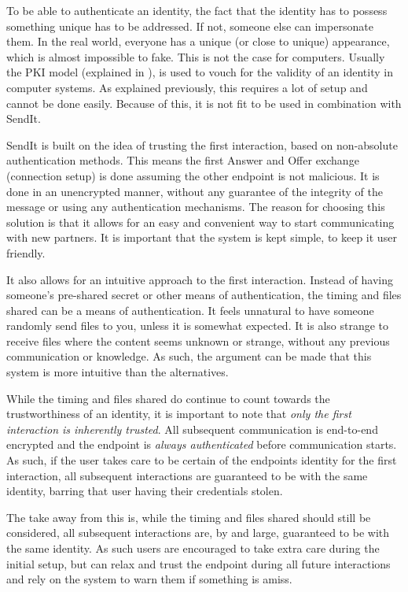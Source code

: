 		To be able to authenticate an identity, the fact that the identity has to possess something unique has to be addressed. If not, someone else can impersonate them. In the real world, everyone has a unique (or close to unique) appearance, which is almost impossible to fake. This is not the case for computers. Usually the PKI model (explained in ), is used to vouch for the validity of an identity in computer systems. As explained previously, this requires a lot of setup and cannot be done easily. Because of this, it is not fit to be used in combination with SendIt. 

		SendIt is built on the idea of trusting the first interaction, based on non-absolute authentication methods. This means the first Answer and Offer exchange (connection setup) is done assuming the other endpoint is not malicious. It is done in an unencrypted manner, without any guarantee of the integrity of the message or using any authentication mechanisms. The reason for choosing this solution is that it allows for an easy and convenient way to start communicating with new partners. It is important that the system is kept simple, to keep it user friendly.

		It also allows for an intuitive approach to the first interaction. Instead of having someone's pre-shared secret or other means of authentication, the timing and files shared can be a means of authentication. It feels unnatural to have someone randomly send files to you, unless it is somewhat expected. It is also strange to receive files where the content seems unknown or strange, without any previous communication or knowledge. As such, the argument can be made that this system is more intuitive than the alternatives.

		While the timing and files shared do continue to count towards the trustworthiness of an identity, it is important to note that \emph{only the first interaction is inherently trusted}. All subsequent communication is end-to-end encrypted and the endpoint is \emph{always authenticated} before communication starts. As such, if the user takes care to be certain of the endpoints identity for the first interaction, all subsequent interactions are guaranteed to be with the same identity, barring that user having their credentials stolen.

		The take away from this is, while the timing and files shared should still be considered, all subsequent interactions are, by and large, guaranteed to be with the same identity. As such users are encouraged to take extra care during the initial setup, but can relax and trust the endpoint during all future interactions and rely on the system to warn them if something is amiss.

